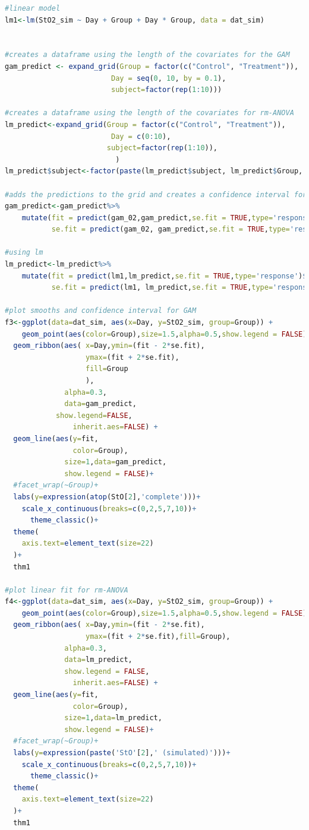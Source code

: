 \documentclass[
]{article}
\begin{document}
\begin{lstlisting}[language=R]
#linear model
lm1<-lm(StO2_sim ~ Day + Group + Day * Group, data = dat_sim)


#creates a dataframe using the length of the covariates for the GAM
gam_predict <- expand_grid(Group = factor(c("Control", "Treatment")),
                         Day = seq(0, 10, by = 0.1),
                         subject=factor(rep(1:10)))

#creates a dataframe using the length of the covariates for rm-ANOVA
lm_predict<-expand_grid(Group = factor(c("Control", "Treatment")),
                         Day = c(0:10),
                        subject=factor(rep(1:10)),
                          )
lm_predict$subject<-factor(paste(lm_predict$subject, lm_predict$Group, sep = "-"))

#adds the predictions to the grid and creates a confidence interval for GAM
gam_predict<-gam_predict%>%
    mutate(fit = predict(gam_02,gam_predict,se.fit = TRUE,type='response')$fit,
           se.fit = predict(gam_02, gam_predict,se.fit = TRUE,type='response')$se.fit)

#using lm
lm_predict<-lm_predict%>%
    mutate(fit = predict(lm1,lm_predict,se.fit = TRUE,type='response')$fit,
           se.fit = predict(lm1, lm_predict,se.fit = TRUE,type='response')$se.fit)

#plot smooths and confidence interval for GAM
f3<-ggplot(data=dat_sim, aes(x=Day, y=StO2_sim, group=Group)) +
    geom_point(aes(color=Group),size=1.5,alpha=0.5,show.legend = FALSE)+
  geom_ribbon(aes( x=Day,ymin=(fit - 2*se.fit), 
                   ymax=(fit + 2*se.fit),
                   fill=Group
                   ),
              alpha=0.3,
              data=gam_predict,
            show.legend=FALSE,
                inherit.aes=FALSE) +
  geom_line(aes(y=fit,
                color=Group),
              size=1,data=gam_predict,
              show.legend = FALSE)+
  #facet_wrap(~Group)+
  labs(y=expression(atop(StO[2],'complete')))+
    scale_x_continuous(breaks=c(0,2,5,7,10))+
      theme_classic()+
  theme(
    axis.text=element_text(size=22)
  )+
  thm1
 
#plot linear fit for rm-ANOVA
f4<-ggplot(data=dat_sim, aes(x=Day, y=StO2_sim, group=Group)) +
    geom_point(aes(color=Group),size=1.5,alpha=0.5,show.legend = FALSE)+
  geom_ribbon(aes( x=Day,ymin=(fit - 2*se.fit), 
                   ymax=(fit + 2*se.fit),fill=Group),
              alpha=0.3,
              data=lm_predict,
              show.legend = FALSE,
                inherit.aes=FALSE) +
  geom_line(aes(y=fit,
                color=Group),
              size=1,data=lm_predict,
              show.legend = FALSE)+
  #facet_wrap(~Group)+
  labs(y=expression(paste('StO'[2],' (simulated)')))+
    scale_x_continuous(breaks=c(0,2,5,7,10))+
      theme_classic()+
  theme(
    axis.text=element_text(size=22)
  )+
  thm1
\end{lstlisting}
\end{document}
